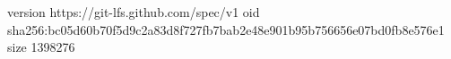 version https://git-lfs.github.com/spec/v1
oid sha256:bc05d60b70f5d9c2a83d8f727fb7bab2e48e901b95b756656e07bd0fb8e576e1
size 1398276
